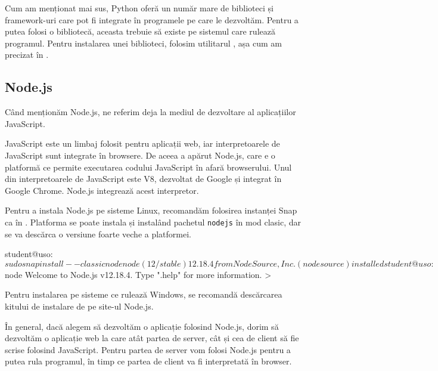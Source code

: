 
Cum am menționat mai sus, Python oferă un număr mare de biblioteci și
framework-uri care pot fi integrate în programele pe care le dezvoltăm. Pentru a
putea folosi o bibliotecă, aceasta trebuie să existe pe sistemul care rulează
programul. Pentru instalarea unei biblioteci, folosim utilitarul , așa cum am precizat în .

\subsection{Node.js}
\label{sec:appdev:dev-env:js}

Când menționăm Node.js, ne referim deja la mediul de dezvoltare al aplicațiilor
JavaScript.

JavaScript este un limbaj folosit pentru aplicații web, iar interpretoarele de
JavaScript sunt integrate în browsere. De aceea a apărut Node.js, care e o
platformă ce permite executarea codului JavaScript în afară browserului. Unul
din interpretoarele de JavaScript este V8, dezvoltat de Google și integrat în
Google Chrome. Node.js integrează acest interpretor.

Pentru a instala Node.js pe sisteme Linux, recomandăm folosirea instanței Snap ca în .
Platforma se poate instala și instalând pachetul \texttt{nodejs} în mod clasic, dar se va descărca o versiune foarte veche a platformei.

\begin{screen}[caption={Instalare Node.js},label={lst:appdev:install-nodejs}]
student@uso:~$ sudo snap install --classic node
node (12/stable) 12.18.4 from NodeSource, Inc. (nodesource) installed

student@uso:~$ node
Welcome to Node.js v12.18.4.
Type ".help" for more information.
>
\end{screen}

Pentru instalarea pe sisteme ce rulează Windows, se recomandă descărcarea
kitului de instalare de pe site-ul Node.js.

În general, dacă alegem să dezvoltăm o aplicație folosind Node.js, dorim să
dezvoltăm o aplicație web la care atât partea de server, cât și cea de client să
fie scrise folosind JavaScript. Pentru partea de server vom folosi Node.js
pentru a putea rula programul, în timp ce partea de client va fi interpretată în
browser.

